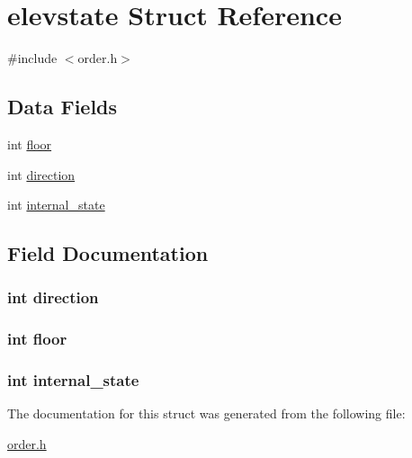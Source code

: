 \hypertarget{structelevstate}{\section{elevstate Struct Reference}
\label{structelevstate}
}


{\ttfamily \#include $<$order.\-h$>$}

\subsection*{Data Fields}
\begin{DoxyCompactItemize}
\item 
int \hyperlink{structelevstate_aae85c3a510bb6ec64e3569ede2518893}{floor}
\item 
int \hyperlink{structelevstate_a886d551d5381dc3e53f17825ffc51641}{direction}
\item 
int \hyperlink{structelevstate_af6c594abce4c058d139513726a24c2a7}{internal\-\_\-state}
\end{DoxyCompactItemize}


\subsection{Field Documentation}
\hypertarget{structelevstate_a886d551d5381dc3e53f17825ffc51641}{
\subsubsection[{direction}]{\setlength{\rightskip}{0pt plus 5cm}int direction}}\label{structelevstate_a886d551d5381dc3e53f17825ffc51641}
\hypertarget{structelevstate_aae85c3a510bb6ec64e3569ede2518893}{
\subsubsection[{floor}]{\setlength{\rightskip}{0pt plus 5cm}int floor}}\label{structelevstate_aae85c3a510bb6ec64e3569ede2518893}
\hypertarget{structelevstate_af6c594abce4c058d139513726a24c2a7}{
\subsubsection[{internal\-\_\-state}]{\setlength{\rightskip}{0pt plus 5cm}int internal\-\_\-state}}\label{structelevstate_af6c594abce4c058d139513726a24c2a7}


The documentation for this struct was generated from the following file\-:\begin{DoxyCompactItemize}
\item 
\hyperlink{order_8h}{order.\-h}\end{DoxyCompactItemize}
